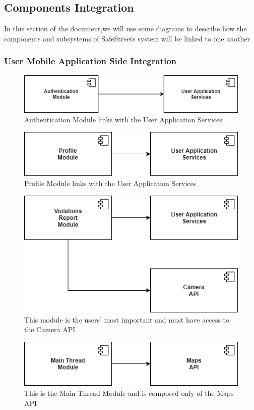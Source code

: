 \documentclass[12pt,a4paper]{article}
\begin{document}
\subsection{Components Integration}
In this section of the document,we will use some diagrams to describe how the components and subsystems of SafeStreets system will be linked to one another
\subsubsection{User Mobile Application Side Integration}
\begin{figure}[H]
		\centering
		\includegraphics[width=0.5\linewidth]{../assets/images/auth_mod.png}
		\caption{Authentication Module links with the User Application Services}
\end{figure}
\begin{figure}[H]
		\centering
		\includegraphics[width=0.5\linewidth]{../assets/images/prof_mod.png}
		\caption{Profile Module links with the User Application Services}
\end{figure}
\begin{figure}[H]
		\centering
		\includegraphics[width=0.5\linewidth]{../assets/images/viol_rep.png}
		\caption{This module is the users' most important and must have access to the Camera API}
\end{figure}
\begin{figure}[H]
		\centering
		\includegraphics[width=0.5\linewidth]{../assets/images/main_thread_mod.png}
		\caption{This is the Main Thread Module and is composed only of the Maps API}
\end{figure}
\end{document}
